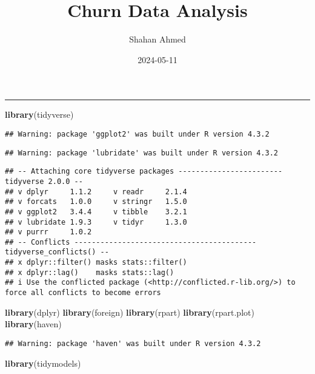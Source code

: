 \documentclass[
]{article}
\title{Churn Data Analysis}
\author{Shahan Ahmed}
\date{2024-05-11}
\newenvironment{Shaded}{\begin{snugshade}}{\end{snugshade}}
\newcommand{\FunctionTok}[1]{\textcolor[rgb]{0.13,0.29,0.53}{\textbf{#1}}}
\newcommand{\NormalTok}[1]{#1}
\begin{document}
\maketitle

\begin{center}\rule{0.5\linewidth}{0.5pt}\end{center}

\begin{Shaded}
\begin{Highlighting}[]
\FunctionTok{library}\NormalTok{(tidyverse)}
\end{Highlighting}
\end{Shaded}

\begin{verbatim}
## Warning: package 'ggplot2' was built under R version 4.3.2
\end{verbatim}

\begin{verbatim}
## Warning: package 'lubridate' was built under R version 4.3.2
\end{verbatim}

\begin{verbatim}
## -- Attaching core tidyverse packages ------------------------ tidyverse 2.0.0 --
## v dplyr     1.1.2     v readr     2.1.4
## v forcats   1.0.0     v stringr   1.5.0
## v ggplot2   3.4.4     v tibble    3.2.1
## v lubridate 1.9.3     v tidyr     1.3.0
## v purrr     1.0.2     
## -- Conflicts ------------------------------------------ tidyverse_conflicts() --
## x dplyr::filter() masks stats::filter()
## x dplyr::lag()    masks stats::lag()
## i Use the conflicted package (<http://conflicted.r-lib.org/>) to force all conflicts to become errors
\end{verbatim}

\begin{Shaded}
\begin{Highlighting}[]
\FunctionTok{library}\NormalTok{(dplyr)}
\FunctionTok{library}\NormalTok{(foreign)}
\FunctionTok{library}\NormalTok{(rpart)}
\FunctionTok{library}\NormalTok{(rpart.plot)}
\FunctionTok{library}\NormalTok{(haven)}
\end{Highlighting}
\end{Shaded}

\begin{verbatim}
## Warning: package 'haven' was built under R version 4.3.2
\end{verbatim}

\begin{Shaded}
\begin{Highlighting}[]
\FunctionTok{library}\NormalTok{(tidymodels)}
\end{Highlighting}
\end{Shaded}
\end{document}
